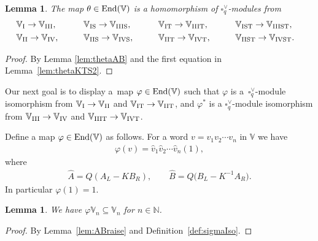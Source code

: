 \documentclass[pdftex]{sigma}
\numberwithin{equation}{section}
\newtheorem{Lemma}[Theorem]{Lemma}
\begin{document}
\begin{Lemma}\label{lem:thetamix} The map $\theta \in {\rm End}(\mathbb V)$ is a homomorphism of $\square^\vee_q$-modules from
\begin{alignat*}{5}
&
\mathbb V_{\rm I} \rightarrow \mathbb V_{\rm III}, \qquad &&
\mathbb V_{\rm IS} \rightarrow \mathbb V_{\rm IIIS}, \qquad &&
\mathbb V_{\rm IT} \rightarrow\mathbb V_{\rm IIIT}, \qquad &&
\mathbb V_{\rm IST} \rightarrow \mathbb V_{\rm IIIST},&
\\
&\mathbb V_{\rm II} \rightarrow \mathbb V_{\rm IV}, \qquad &&
\mathbb V_{\rm IIS} \rightarrow \mathbb V_{\rm IVS}, \qquad &&
\mathbb V_{\rm IIT} \rightarrow \mathbb V_{\rm IVT}, \qquad &&
\mathbb V_{\rm IIST} \rightarrow \mathbb V_{\rm IVST}.&
\end{alignat*}
\end{Lemma}
\begin{proof} By Lemma \ref{lem:thetaAB} and the first equation in Lemma~\ref{lem:thetaKTS2}.
\end{proof}

Our next goal is to display a~map $\varphi \in {\rm End}(\mathbb V)$ such that $\varphi$ is a~$\square^\vee_q$-module isomorphism from $\mathbb V_{\rm I}\to \mathbb V_{\rm II}$ and $\mathbb V_{\rm IT}\to \mathbb V_{\rm IIT}$, and $\varphi^*$ is a $\square^\vee_q$-module isomorphism from $\mathbb V_{\rm III}\to \mathbb V_{\rm IV}$ and $\mathbb V_{\rm IIIT}\to \mathbb V_{\rm IVT}$.

\begin{Definition}\label{def:sigmaIso}Define a map $\varphi \in {\rm End}(\mathbb V)$ as follows. For a word $v=v_1v_2\cdots v_n$ in $\mathbb V$ we have
\begin{gather}\label{eq:sigIso}
\varphi(v) =\widehat v_1\widehat v_2\cdots\widehat v_n (1),
\end{gather}
where
\begin{gather}\label{eq:widehatAB}
\widehat A = Q(A_L-KB_R), \qquad
\widehat B = Q\big(B_L-K^{-1}A_R\big).
\end{gather}
In particular $\varphi (1)=1$.
\end{Definition}

\begin{Lemma}\label{lem:sigmaAct}We have $\varphi \mathbb V_n \subseteq \mathbb V_n$ for $n\in \mathbb N$.
\end{Lemma}
\begin{proof} By Lemma~\ref{lem:ABraise} and Definition~\ref{def:sigmaIso}.
\end{proof}
\end{document}
